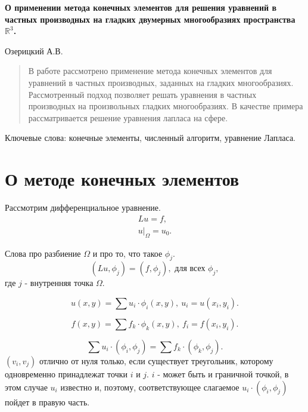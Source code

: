 \documentclass[a4paper]{article}
\begin{document}

{\bf \Large О применении метода конечных элементов для решения
  уравнений в частных производных на гладких двумерных многообразиях
  пространства ${\mathbb R}^{3}$.}

\begin{center}
Озерицкий А.В.
\end{center}

\renewcommand{\abstractname}{}
\begin{abstract}
{\small
{}
В работе рассмотрено применение метода конечных элементов для
уравнений в частных производных, заданных на гладких многообразиях.
Рассмотренный подход позволяет решать уравнения в частных производных
на произвольных гладких многообразиях. 
В качестве примера рассматривается решение уравнения лапласа на сфере.}
\end{abstract}

Ключевые слова: конечные элементы, численный алгоритм, уравнение
Лапласа.

\section*{О методе конечных элементов}
Рассмотрим дифференциальное уравнение.
\begin{equation*}
\begin{split}
Lu = f,\\
u|_\Omega=u_0.
\end{split}
\end{equation*}

Слова про разбиение $\Omega$ и про то, что такое $\phi_j$.
\begin{equation*}
(Lu, \phi_j) = (f, \phi_j), \text{ для всех } \phi_j,
\end{equation*}
где $j$ - внутренняя точка $\Omega$.

\begin{equation*}
u(x,y)=\sum u_i \cdot \phi_i (x, y),\ u_i=u(x_i,y_i).
\end{equation*}

\begin{equation*}
f(x,y)=\sum f_k \cdot \phi_k (x, y),\ f_i=f(x_i,y_i).
\end{equation*}

\begin{equation*}
\sum u_i \cdot (\phi_i, \phi_j) = \sum f_k \cdot (\phi_k, \phi_j).
\end{equation*}
$(v_i, v_j)$ отлично от нуля только, если существует треугольник,
которому одновременно принадлежат точки $i$ и $j$. $i$ - может быть и
граничной точкой, в этом случае $u_i$ известно и, поэтому,
соответствующее слагаемое $u_i\cdot (\phi_i, \phi_j)$ пойдет в правую часть.
\end{document}
